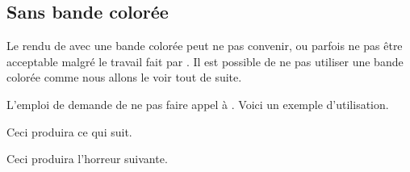 \documentclass[10pt, a4paper, theme = color]{tutodoc}
\begin{document}
\subsection{Sans bande colorée}

Le rendu de  avec une bande colorée peut ne pas convenir, ou parfois ne pas être acceptable malgré le travail fait par .
Il est possible de ne pas utiliser une bande colorée comme nous allons le voir tout de suite.


\begin{tdocexa}
    L'emploi de  demande de ne pas faire appel à .
    Voici un exemple d'utilisation.


    Ceci produira ce qui suit.

    \medskip

    
\end{tdocexa}


\begin{tdocexa}
    \leavevmode


    Ceci produira l'horreur suivante.

    \medskip

    
\end{tdocexa}
\end{document}
